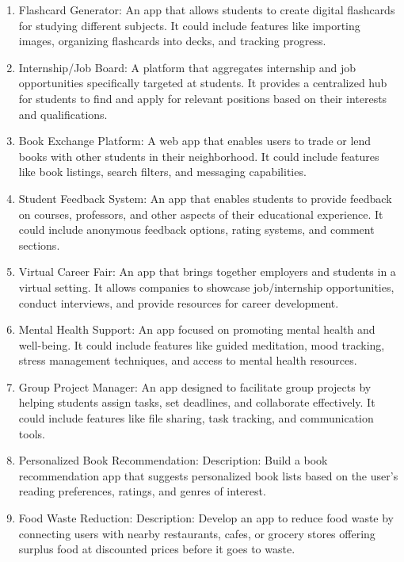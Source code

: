 \documentclass[a4paper,12pt]{article}
\begin{document}
\begin{large}
\begin{enumerate}
\item Flashcard Generator: An app that allows students to create digital flashcards for studying different subjects. It could include features like importing images, organizing flashcards into decks, and tracking progress.

\item Internship/Job Board: A platform that aggregates internship and job opportunities specifically targeted at students. It provides a centralized hub for students to find and apply for relevant positions based on their interests and qualifications.

\item Book Exchange Platform: A web app that enables users to trade or lend books with other students in their neighborhood. It could include features like book listings, search filters, and messaging capabilities.

\item Student Feedback System: An app that enables students to provide feedback on courses, professors, and other aspects of their educational experience. It could include anonymous feedback options, rating systems, and comment sections.

\item Virtual Career Fair: An app that brings together employers and students in a virtual setting. It allows companies to showcase job/internship opportunities, conduct interviews, and provide resources for career development.

\item Mental Health Support: An app focused on promoting mental health and well-being. It could include features like guided meditation, mood tracking, stress management techniques, and access to mental health resources.

\item Group Project Manager: An app designed to facilitate group projects by helping students assign tasks, set deadlines, and collaborate effectively. It could include features like file sharing, task tracking, and communication tools.

\item Personalized Book Recommendation: Description: Build a book recommendation app that suggests personalized book lists based on the user's reading preferences, ratings, and genres of interest.

\item Food Waste Reduction: Description: Develop an app to reduce food waste by connecting users with nearby restaurants, cafes, or grocery stores offering surplus food at discounted prices before it goes to waste.


\end{enumerate}
\end{large}
\end{document}

